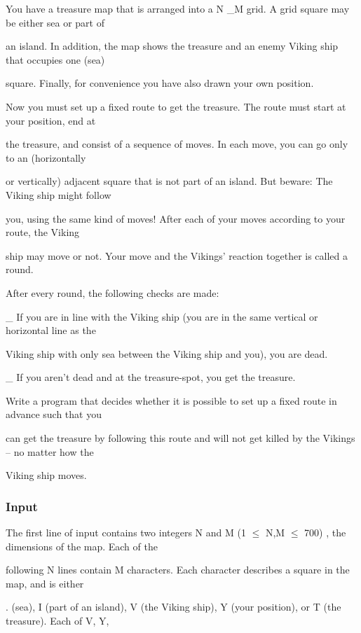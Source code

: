 

You have a treasure map that is arranged into a N \_M grid. A grid square may be either sea or part of

an island. In addition, the map shows the treasure and an enemy Viking ship that occupies one (sea)

square. Finally, for convenience you have also drawn your own position.

Now you must set up a fixed route to get the treasure. The route must start at your position, end at

the treasure, and consist of a sequence of moves. In each move, you can go only to an (horizontally

or vertically) adjacent square that is not part of an island. But beware: The Viking ship might follow

you, using the same kind of moves! After each of your moves according to your route, the Viking

ship may move or not. Your move and the Vikings’ reaction together is called a round.

After every round, the following checks are made:

\_ If you are in line with the Viking ship (you are in the same vertical or horizontal line as the

Viking ship with only sea between the Viking ship and you), you are dead.

\_ If you aren’t dead and at the treasure-spot, you get the treasure.

Write a program that decides whether it is possible to set up a fixed route in advance such that you

can get the treasure by following this route and will not get killed by the Vikings – no matter how the

Viking ship moves.

\subsubsection{Input}

The first line of input contains two integers N and M (1 $\le$ N,M $\le$ 700) , the dimensions of the map. Each of the

following N lines contain M characters. Each character describes a square in the map, and is either

. (sea), I (part of an island), V (the Viking ship), Y (your position), or T (the treasure). Each of V, Y,

